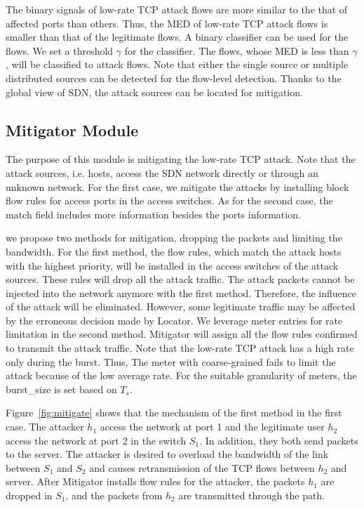 \documentclass[conference]{IEEEtran}
\begin{document}
The binary signals of low-rate TCP attack flows are more similar to the that of affected ports than others. Thus, the MED of low-rate TCP attack flows is smaller than that of the legitimate flows. A binary classifier can be used for the flows. We set a threshold $\gamma$ for the classifier. The flows, whose MED is less than $\gamma$, will be classified to attack flows. Note that either the single source or multiple distributed sources can be detected for the flow-level detection. Thanks to the global view of SDN, the attack sources can be located for mitigation.

\subsection{Mitigator Module}

The purpose of this module is mitigating the low-rate TCP attack. Note that the attack sources, i.e. hosts, access the SDN network directly or through an unknown network. For the first case, we mitigate the attacks by installing block flow rules for access ports in the access switches. As for the second case, the match field includes more information besides the ports information. 

we propose two methods for mitigation, dropping the packets and limiting the bandwidth. For the first method, the flow rules, which match the attack hosts with the highest priority, will be installed in the access switches of the attack sources. These rules will drop all the attack traffic. The attack packets cannot be injected into the network anymore with the first method. Therefore, the influence of the attack will be eliminated. However, some legitimate traffic may be affected by the erroneous decision made by Locator. We leverage meter entries for rate limitation in the second method. Mitigator will assign all the flow rules confirmed to transmit the attack traffic. Note that the low-rate TCP attack has a high rate only during the burst. Thus, The meter with coarse-grained fails to limit the attack because of the low average rate. For the suitable granularity of meters, the burst\_size is set based on $T_s$.

Figure~\ref{fig:mitigate} shows that the mechanism of the first method in the first case. The attacker $h_1$ access the network at port 1 and the legitimate user $h_2$ access the network at port 2 in the switch $S_1$. In addition, they both send packets to the server. The attacker is desired to overload the bandwidth of the link between $S_1$ and $S_2$ and causes retransmission of the TCP flows between $h_2$ and server. After Mitigator installs flow rules for the attacker, the packets $h_1$ are dropped in $S_1$, and the packets from $h_2$ are transmitted through the path. 
\end{document}
